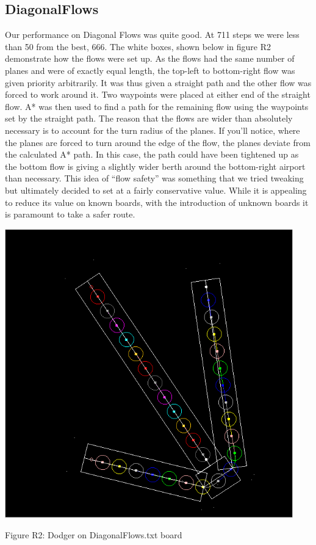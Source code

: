 \documentclass[10pt]{article}
\begin{document}
\subsection{DiagonalFlows}

Our performance on Diagonal Flows was quite good. At 711 steps we were less than 50 from the best, 666. The white boxes, shown below in figure R2 demonstrate how the flows were set up. As the flows had the same number of planes and were of exactly equal length, the top-left to bottom-right flow was given priority arbitrarily. It was thus given a straight path and the other flow was forced to work around it. Two waypoints were placed at either end of the straight flow. A* was then used to find a path for the remaining flow using the waypoints set by the straight path. The reason that the flows are wider than absolutely necessary is to account for the turn radius of the planes. If you’ll notice, where the planes are forced to turn around the edge of the flow, the planes deviate from the calculated A* path. In this case, the path could have been tightened up as the bottom flow is giving a slightly wider berth around the bottom-right airport than necessary. This idea of “flow safety” was something that we tried tweaking but ultimately decided to set at a fairly conservative value. While it is appealing to reduce its value on known boards, with the introduction of unknown boards it is paramount to take a safer route.

\includegraphics[width=125mm]{pics/R2.png}
\caption{Figure R2: Dodger on DiagonalFlows.txt board}
\end{document}
